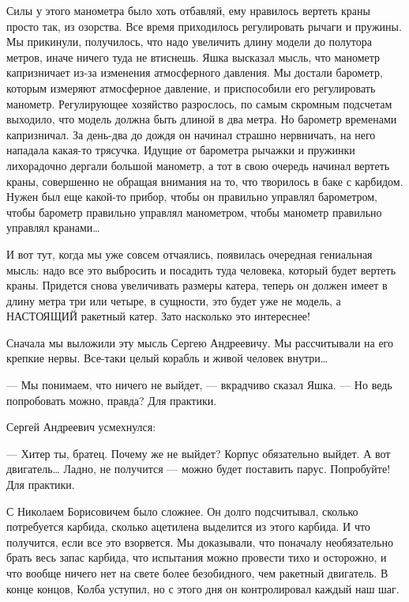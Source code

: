 Силы у этого  манометра было  хоть отбавляй, ему  нравилось вертеть  краны
просто так,  из  озорства. Все  время  приходилось регулировать  рычаги  и
пружины. Мы  прикинули, получилось,  что надо  увеличить длину  модели  до
полутора метров, иначе ничего туда  не втиснешь. Яшка высказал мысль,  что
манометр капризничает из-за  изменения атмосферного  давления. Мы  достали
барометр,  которым  измеряют  атмосферное  давление,  и  приспособили  его
регулировать  манометр.  Регулирующее   хозяйство  разрослось,  по   самым
скромным подсчетам выходило, что модель должна быть длиной в два метра. Но
барометр временами капризничал.  За день-два до  дождя он начинал  страшно
нервничать, на  него  нападала  какая-то  трясучка.  Идущие  от  барометра
рычажки и  пружинки лихорадочно  дергали большой  манометр, а  тот в  свою
очередь начинал вертеть краны, совершенно  не обращая внимания на то,  что
творилось в  баке с  карбидом. Нужен  был еще  какой-то прибор,  чтобы  он
правильно  управлял   барометром,   чтобы  барометр   правильно   управлял
манометром, чтобы манометр правильно управлял кранами…

И вот тут, когда мы  уже совсем отчаялись, появилась очередная  гениальная
мысль: надо  все это  выбросить и  посадить туда  человека, который  будет
вертеть краны. Придется снова увеличивать размеры катера, теперь он должен
имеет в длину метра три или четыре, в сущности, это будет уже не модель, а
НАСТОЯЩИЙ ракетный катер. Зато насколько это интереснее!

Сначала мы выложили эту  мысль Сергею Андреевичу.  Мы рассчитывали на  его
крепкие нервы. Все-таки целый корабль и живой человек внутри…

— Мы понимаем, что ничего  не выйдет, — вкрадчиво  сказал Яшка. — Но  ведь
попробовать можно, правда? Для практики.

Сергей Андреевич усмехнулся:

— Хитер ты, братец. Почему же не выйдет? Корпус обязательно выйдет. А  вот
двигатель… Ладно, не получится — можно будет поставить парус.  Попробуйте!
Для практики.

С  Николаем  Борисовичем  было  сложнее.  Он  долго  подсчитывал,  сколько
потребуется карбида, сколько ацетилена выделится  из этого карбида. И  что
получится,  если   все  это   взорвется.  Мы   доказывали,  что   поначалу
необязательно брать весь запас карбида, что испытания можно провести  тихо
и осторожно,  и что  вообще ничего  нет на  свете более  безобидного,  чем
ракетный двигатель.  В конце  концов, Колба  уступил, но  с этого  дня  он
контролировал каждый наш шаг.


